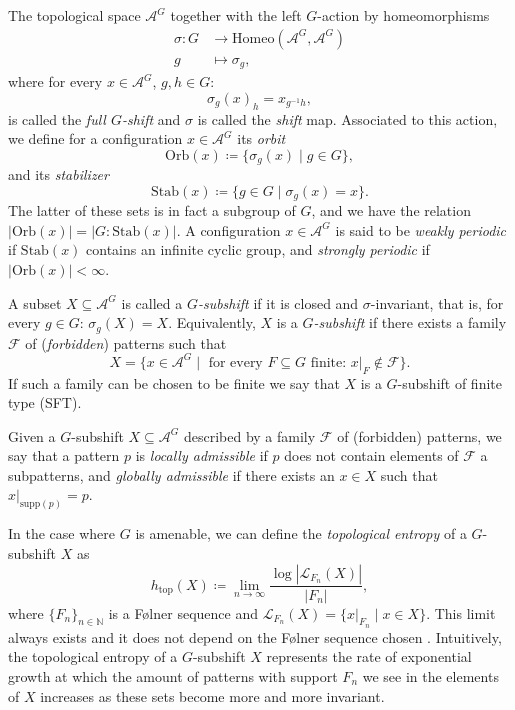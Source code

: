 \documentclass[cupthm,crop,info]{CUP-JNL-ETS}%
\theoremstyle{cupplain}
\theoremstyle{cupdefinition}
\theoremstyle{cupremark}
\theoremstyle{cupproof}
\numberwithin{equation}{section}
\def\htop{h_{\mathrm{top}}}
\begin{document}
The topological space $\mathcal{A}^G$ together with the left $G$-action by homeomorphisms
\begin{align*}
\sigma:G&\to \mathrm{Homeo}(\mathcal{A}^G,\mathcal{A}^G)\\
g&\mapsto \sigma_g,
\end{align*}
where for every $x\in \mathcal{A}^G$, $g,h\in G$:
$$
\sigma_g(x)_h=x_{g^{-1}h},
$$
is called the \textit{full $G$-shift} and $\sigma$ is called the \textit{shift} map. Associated to this action, we define for a configuration $x\in \mathcal{A}^G$ its \textit{orbit} $$\mathrm{Orb}(x)\coloneqq\{\sigma_g(x)\mid g\in G \},$$ and its \textit{stabilizer} $$\mathrm{Stab}(x)\coloneqq \{g\in G\mid \sigma_g(x)=x \}.$$ The latter of these sets is in fact a subgroup of $G$, and we have the relation $|\mathrm{Orb}(x)|=|G:\mathrm{Stab}(x)|$. A configuration $x\in \mathcal{A}^G$ is said to be \textit{weakly periodic} if $\mathrm{Stab}(x)$ contains an infinite cyclic group, and \textit{strongly periodic} if $|\mathrm{Orb}(x)|<\infty$.


A subset $X\subseteq \mathcal{A}^G$ is called a \textit{$G$-subshift} if it is closed and $\sigma$-invariant, that is, for every $g\in G$: $\sigma_g(X)=X$. Equivalently, $X$ is a \textit{$G$-subshift} if there exists a family $\mathcal{F}$ of (\textit{forbidden}) patterns such that
$$
X=\{x\in \mathcal{A}^G\mid \text{ for every }F\subseteq G \text{ finite: }x|_{F}\notin \mathcal{F}  \}.
$$ 
If such a family can be chosen to be finite we say that $X$ is a $G$-subshift of finite type (SFT).


Given a $G$-subshift $X\subseteq \mathcal{A}^G$ described by a family $\mathcal{F}$ of (forbidden) patterns, we say that a pattern $p$ is \textit{locally admissible} if $p$ does not contain elements of $\mathcal{F}$ a subpatterns, and \textit{globally admissible} if there exists an $x\in X$ such that $x|_{\mathrm{supp}(p)}=p$.


In the case where $G$ is amenable, we can define the \textit{topological entropy} of a $G$-subshift $X$ as
$$
\htop(X)\coloneqq \lim_{n\to \infty}\frac{\log|\mathcal{L}_{F_n}(X)|}{|F_n|},
$$
where $\{F_n\}_{n\in \mathbb{N}}$ is a F\o lner sequence and $\mathcal{L}_{F_n}(X)=\{x|_{F_n}\mid x\in X\}$. This limit always exists and it does not depend on the F\o lner sequence chosen \cite[Theorem~4.38]{Kerr2016}. Intuitively, the topological entropy of a $G$-subshift $X$ represents the rate of exponential growth at which the amount of patterns with support $F_n$ we see in the elements of $X$ increases as these sets become more and more invariant.
\end{document}
